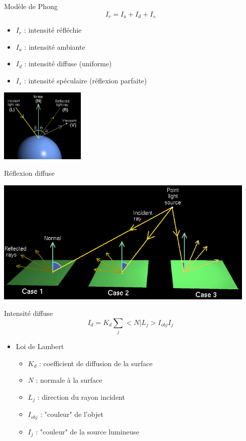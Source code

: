 \begin{frame}[t]{Modèle de Phong}
  $$ I_r = I_a + I_d + I_s $$
  \begin{itemize}
    \item $I_r$ : intensité réfléchie
    \item $I_a$ : intensité ambiante
    \item $I_d$ : intensité diffuse (uniforme)
    \item $I_s$ : intensité spéculaire (réflexion parfaite)
  \end{itemize}
  \begin{center}
  \includegraphics[height=3.5cm]{figs/normals.png}
  \end{center}

\end{frame}

\begin{frame}[t]{Réflexion diffuse}
  \begin{center}
    \includegraphics[height=6cm]{figs/diffuse.png}
  \end{center}
\end{frame}

\begin{frame}[t]{Intensité diffuse}
  $$ I_d = K_d \sum_j < N | L_j > I_{obj} I_j $$
  \begin{itemize}
    \item Loi de Lambert
      \begin{itemize}
        \item $K_d$ : coefficient de diffusion de la surface
        \item $N$ : normale à la surface
        \item $L_j$ : direction du rayon incident
        \item $I_{obj}$ : "couleur" de l'objet
        \item $I_j$ : "couleur" de la source lumineuse
      \end{itemize}
  \end{itemize}
\end{frame}

